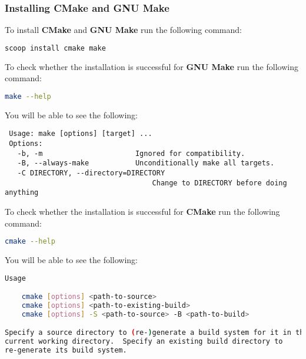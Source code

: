 
\subsubsection{Installing CMake and GNU Make}
To install \textbf{CMake} and \textbf{GNU Make} run the following
command:

\begin{lstlisting}[language=bash]
 scoop install cmake make 
\end{lstlisting}
 
To check whether the installation is successful for \textbf{GNU Make} run the following command:

\begin{lstlisting}[language=bash]
make --help
\end{lstlisting}

You will be able to see the following:
\begin{lstlisting}
 Usage: make [options] [target] ...
 Options:
   -b, -m                      Ignored for compatibility.
   -B, --always-make           Unconditionally make all targets.
   -C DIRECTORY, --directory=DIRECTORY
                                   Change to DIRECTORY before doing anything
\end{lstlisting}
    
To check whether the installation is successful for \textbf{CMake} run the following command:

\begin{lstlisting}[language=bash]
cmake --help
\end{lstlisting}

You will be able to see the following:

\begin{lstlisting}[language=bash]
Usage

    cmake [options] <path-to-source>
    cmake [options] <path-to-existing-build>
    cmake [options] -S <path-to-source> -B <path-to-build>

Specify a source directory to (re-)generate a build system for it in the
current working directory.  Specify an existing build directory to
re-generate its build system.
\end{lstlisting}

